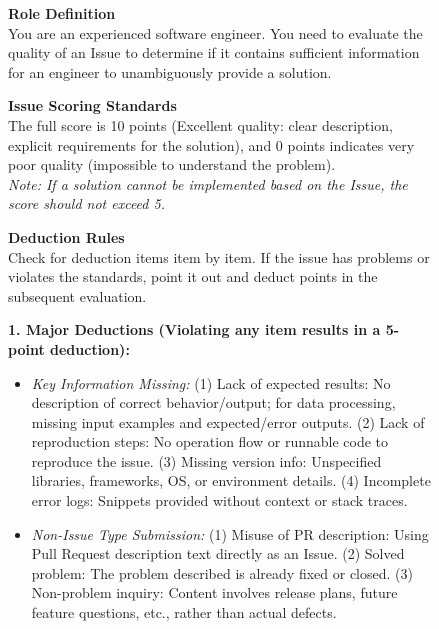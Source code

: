 \documentclass{article}
\theoremstyle{plain}
\theoremstyle{definition}
\theoremstyle{remark}
\begin{document}
\begin{figure}[t]
\centering
\begin{tcolorbox}[
    colback=white,
    colframe=gray!60,
    title=\textbf{Prompt for Issue Quality Evaluation},
    coltitle=white,
    boxrule=0.8pt,
    arc=2pt,
    width=\linewidth
]
\small

\textbf{Role Definition} \\
You are an experienced software engineer. You need to evaluate the quality of an Issue to determine if it contains sufficient information for an engineer to unambiguously provide a solution.

\vspace{0.5em}
\textbf{Issue Scoring Standards} \\
The full score is 10 points (Excellent quality: clear description, explicit requirements for the solution), and 0 points indicates very poor quality (impossible to understand the problem). \\
\textit{Note: If a solution cannot be implemented based on the Issue, the score should not exceed 5.}

\vspace{0.5em}
\textbf{Deduction Rules} \\
Check for deduction items item by item. If the issue has problems or violates the standards, point it out and deduct points in the subsequent evaluation.

\textbf{1. Major Deductions (Violating any item results in a 5-point deduction):}
\begin{itemize}[leftmargin=15pt, topsep=2pt, itemsep=0pt, parsep=0pt]
    \item \textit{Key Information Missing:}
    (1) Lack of expected results: No description of correct behavior/output; for data processing, missing input examples and expected/error outputs.
    (2) Lack of reproduction steps: No operation flow or runnable code to reproduce the issue.
    (3) Missing version info: Unspecified libraries, frameworks, OS, or environment details.
    (4) Incomplete error logs: Snippets provided without context or stack traces.
    \item \textit{Non-Issue Type Submission:}
    (1) Misuse of PR description: Using Pull Request description text directly as an Issue.
    (2) Solved problem: The problem described is already fixed or closed.
    (3) Non-problem inquiry: Content involves release plans, future feature questions, etc., rather than actual defects.
\end{itemize}


\end{tcolorbox}
\end{figure}
\end{document}
